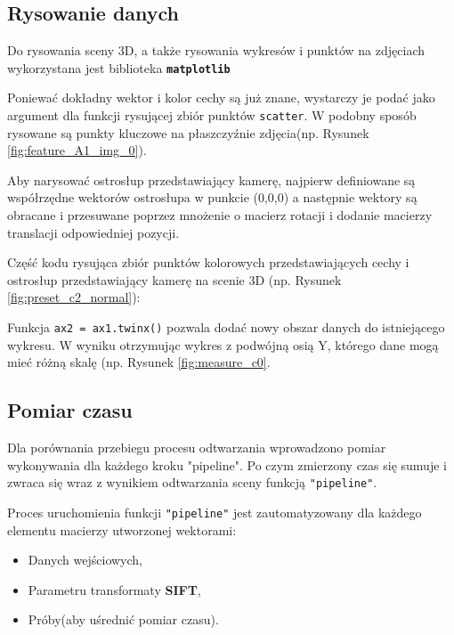 \subsection{Rysowanie danych}

Do rysowania sceny 3D, a także rysowania wykresów i punktów na zdjęciach wykorzystana jest biblioteka \textbf{\texttt{matplotlib}}

Poniewać dokładny wektor i kolor cechy są już znane, wystarczy je podać jako argument dla funkcji rysującej zbiór punktów \texttt{scatter}.
W podobny sposób rysowane są punkty kluczowe na płaszczyźnie zdjęcia(np. Rysunek \ref{fig:feature_A1_img_0}).

Aby narysować ostrosłup przedstawiający kamerę, najpierw definiowane są współrzędne wektorów ostrosłupa w punkcie (0,0,0) a następnie wektory są obracane i przesuwane poprzez mnożenie o macierz rotacji i dodanie macierzy translacji odpowiedniej pozycji.

Część kodu rysująca zbiór punktów kolorowych przedstawiających cechy i  ostrosłup przedstawiający kamerę na scenie 3D (np. Rysunek \ref{fig:preset_c2_normal}):


Funkcja \texttt{ax2 = ax1.twinx()} pozwala dodać nowy obszar danych do istniejącego wykresu. W wyniku otrzymując wykres z podwójną osią Y, którego dane mogą mieć różną skalę (np. Rysunek \ref{fig:measure_c0}.

\subsection{Pomiar czasu}

Dla porównania przebiegu procesu odtwarzania wprowadzono pomiar wykonywania dla każdego kroku "pipeline". Po czym zmierzony czas się sumuje i zwraca się wraz z wynikiem odtwarzania sceny funkcją \texttt{"pipeline"}.

Proces uruchomienia funkcji \texttt{"pipeline"} jest zautomatyzowany dla każdego elementu macierzy utworzonej wektorami:
\begin{itemize}
   \item Danych wejściowych,
   \item Parametru transformaty \textbf{SIFT},
   \item Próby(aby uśrednić pomiar czasu).
\end{itemize}
